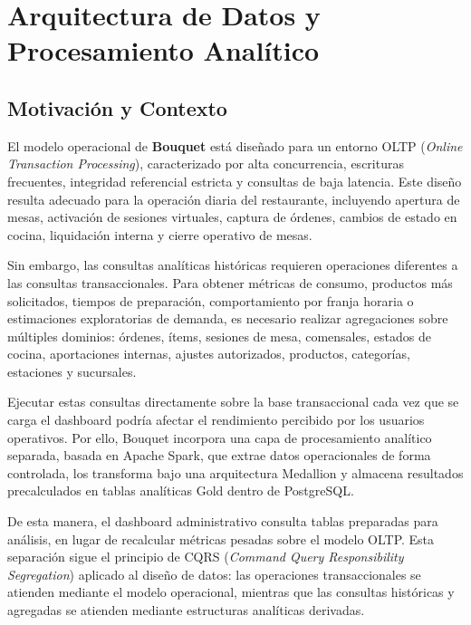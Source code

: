 \section{Arquitectura de Datos y Procesamiento Analítico}

\subsection{Motivación y Contexto}

El modelo operacional de \textbf{Bouquet} está diseñado para un entorno OLTP
(\textit{Online Transaction Processing}), caracterizado por alta concurrencia,
escrituras frecuentes, integridad referencial estricta y consultas de baja latencia.
Este diseño resulta adecuado para la operación diaria del restaurante, incluyendo
apertura de mesas, activación de sesiones virtuales, captura de órdenes, cambios de
estado en cocina, liquidación interna y cierre operativo de mesas.

Sin embargo, las consultas analíticas históricas requieren operaciones diferentes a las
consultas transaccionales. Para obtener métricas de consumo, productos más solicitados,
tiempos de preparación, comportamiento por franja horaria o estimaciones exploratorias
de demanda, es necesario realizar agregaciones sobre múltiples dominios: órdenes,
ítems, sesiones de mesa, comensales, estados de cocina, aportaciones internas,
ajustes autorizados, productos, categorías, estaciones y sucursales.

Ejecutar estas consultas directamente sobre la base transaccional cada vez que se carga
el dashboard podría afectar el rendimiento percibido por los usuarios operativos. Por
ello, Bouquet incorpora una capa de procesamiento analítico separada, basada en
Apache Spark, que extrae datos operacionales de forma controlada, los transforma bajo
una arquitectura Medallion y almacena resultados precalculados en tablas analíticas
Gold dentro de PostgreSQL.

De esta manera, el dashboard administrativo consulta tablas preparadas para análisis,
en lugar de recalcular métricas pesadas sobre el modelo OLTP. Esta separación sigue el
principio de CQRS (\textit{Command Query Responsibility Segregation}) aplicado al diseño
de datos: las operaciones transaccionales se atienden mediante el modelo operacional,
mientras que las consultas históricas y agregadas se atienden mediante estructuras
analíticas derivadas.

